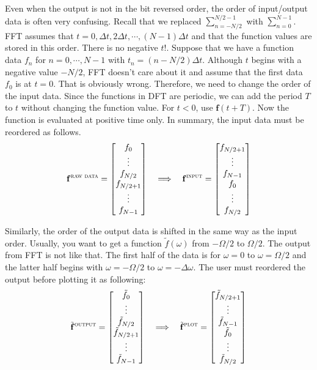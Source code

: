 Even when the output is not in the bit reversed order, the order of input/output data is often very confusing.  Recall that we replaced $\sum_{n=-N/2}^{N/2-1}$ with $\sum_{n=0}^{N-1}$.
FFT assumes that $t=0, \Delta t, 2\Delta t, \cdots, (N-1)\Delta t$ and that the function values are stored in this order. There is no negative $t$!.  Suppose that we have a function data $f_n$ for $n=0, \cdots, N-1$ with $t_n = (n-N/2) \Delta t$.  Although $t$ begins with a negative value $-N/2$, FFT doesn't care about it and assume that the first data $f_0$ is at $t=0$. That is obviously wrong.  Therefore, we need to change the order of the input data.  Since the functions in DFT are periodic, we can add the period $T$ to $t$ without changing the function value.  For $t<0$, use $\mathbf{f}(t+T)$. Now the function is evaluated at positive time only.  In summary, the input data must be reordered as follows.
\begin{equation}
\mathbf{f}^\textsc{raw data}=
\begin{bmatrix}
f_0\\
\vdots\\
f_{N/2}\\
f_{N/2+1}\\
\vdots\\
f_{N-1}
\end{bmatrix} \quad \Longrightarrow \quad
\mathbf{f}^\textsc{input} =
\begin{bmatrix}
f_{N/2+1} \\
\vdots \\
f_{N-1} \\
f_0\\
\vdots\\
f_{N/2}
\end{bmatrix}
\end{equation}

Similarly, the order of the output data is shifted in the same way as the input order.
Usually, you want to get a function $\tilde{f}(\omega)$ from $-\Omega/2$ to $\Omega/2$.  The output from FFT is not like that.  The first half of the data is for $\omega = 0$ to $\omega=\Omega/2$ and the latter half begins with $\omega=-\Omega/2$   to $\omega=-\Delta \omega$.  The user must reordered the output before plotting it as following:
\begin{equation}
\tilde{\mathbf{f}}^\textsc{output} = 
\begin{bmatrix}
\tilde{f}_0\\
\vdots\\
\tilde{f}_{N/2}\\
\tilde{f}_{N/2+1}\\
\vdots\\
\tilde{f}_{N-1}
\end{bmatrix} \quad \Longrightarrow \quad
\tilde{\mathbf{f}}^\textsc{plot} =
\begin{bmatrix}
\tilde{f}_{N/2+1}\\
\vdots\\
\tilde{f}_{N-1}\\
\tilde{f}_{0}\\
\vdots\\
\tilde{f}_{N/2}
\end{bmatrix}
\end{equation}

